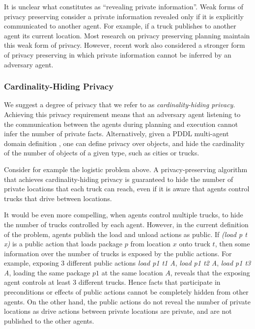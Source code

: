 \documentclass[letterpaper]{article}
\theoremstyle{definition}
\begin{document}
It is unclear what constitutes as ``revealing private information''. Weak forms of privacy preserving consider a private information revealed only if it is explicitly communicated to another agent. For example, if a truck publishes to another agent its current location. 
Most research on privacy preserving planning maintain this weak form of privacy. However, recent work \cite{Brafman15} also considered a stronger form of privacy preserving in which private information cannot be inferred by an adversary agent. 

\subsubsection{Cardinality-Hiding Privacy}


We suggest a degree of privacy that we refer to as {\em cardinality-hiding privacy}. Achieving this privacy requirement means that an adversary agent listening to the communication between the agents during planning and execution cannot infer the number of private facts. Alternatively, given a PDDL multi-agent domain definition \cite{vstolba2015competition}, one can define privacy over objects, and hide the cardinality of the number of objects of a given type, such as cities or trucks.


Consider for example the logistic problem above. A privacy-preserving algorithm that achieves cardinality-hiding privacy is guaranteed to hide the number of private locations that each truck can reach, even if it is aware that agents control trucks that drive between locations.

It would be even more compelling, when agents control multiple trucks, to hide the number of trucks controlled by each agent. However, in the current definition of the problem, agents publish the load and unload actions as public. If {\em (load p t x)} is a public action that loads package $p$ from location $x$ onto truck $t$, then some information over the number of trucks is exposed by the public actions. For example, exposing 3 different public actions {\em load p1 t1 A}, {\em load p1 t2 A}, {\em load p1 t3 A}, loading the same package $p1$ at the same location $A$, reveals that the exposing agent controls at least 3 different trucks. Hence facts that participate in preconditions or effects of public actions cannot be completely hidden from other agents. On the other hand, 
the public actions do not reveal the number of private locations as drive actions between private locations are private, and are not published to the other agents. 
\end{document}
